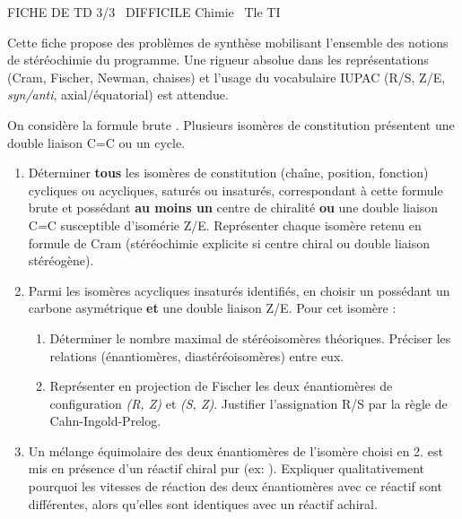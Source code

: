 \documentclass[11pt]{article}
\begin{document}
\begin{tcolorbox}[enhanced,colback=popink,colframe=popink,arc=10pt,boxrule=0pt,left=12pt,right=12pt,top=9pt,bottom=9pt]
{\color{white}\popxbold\small FICHE DE TD 3/3 \textbullet\ DIFFICILE \hfill Chimie \textbullet\ Tle TI\par}
\end{tcolorbox}
\vspace{4pt}
Cette fiche propose des problèmes de synthèse mobilisant l'ensemble des notions de stéréochimie du programme. Une rigueur absolue dans les représentations (Cram, Fischer, Newman, chaises) et l'usage du vocabulaire IUPAC (R/S, Z/E, \textit{syn/anti}, axial/équatorial) est attendue.

\begin{exercice}
On considère la formule brute . Plusieurs isomères de constitution présentent une double liaison C=C ou un cycle.
\begin{enumerate}
    \item Déterminer \textbf{tous} les isomères de constitution (chaîne, position, fonction) cycliques ou acycliques, saturés ou insaturés, correspondant à cette formule brute et possédant \textbf{au moins un} centre de chiralité \textbf{ou} une double liaison C=C susceptible d'isomérie Z/E. Représenter chaque isomère retenu en formule de Cram (stéréochimie explicite si centre chiral ou double liaison stéréogène).
    \item Parmi les isomères acycliques insaturés identifiés, en choisir un possédant un carbone asymétrique \textbf{et} une double liaison Z/E. Pour cet isomère :
    \begin{enumerate}
        \item Déterminer le nombre maximal de stéréoisomères théoriques. Préciser les relations (énantiomères, diastéréoisomères) entre eux.
        \item Représenter en projection de Fischer les deux énantiomères de configuration \textit{(R, Z)} et \textit{(S, Z)}. Justifier l'assignation R/S par la règle de Cahn-Ingold-Prelog.
    \end{enumerate}
    \item Un mélange équimolaire des deux énantiomères de l'isomère choisi en 2. est mis en présence d'un réactif chiral pur (ex: ). Expliquer qualitativement pourquoi les vitesses de réaction des deux énantiomères avec ce réactif sont différentes, alors qu'elles sont identiques avec un réactif achiral.
\end{enumerate}
\end{exercice}
\end{document}
